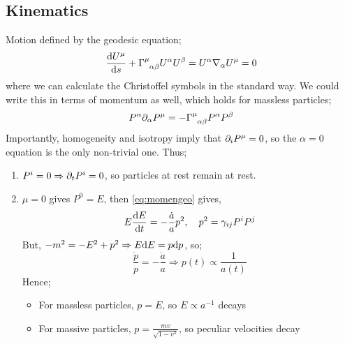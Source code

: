 \subsection{Kinematics}
Motion defined by the geodesic equation;
\begin{equation}
\frac{\ud U^\mu}{\ud s} + \Gamma\indices{^\mu_{\alpha \beta}}U^{\alpha}U^{\beta} = U^{\alpha} \nabla_{\alpha} U^{\mu} = 0
\end{equation}
where we can calculate the Christoffel symbols in the standard way. We could write this in terms of momentum as well, which holds for massless particles;
\begin{equation}
\label{eq:momengeo}
P^{\alpha} \del_\alpha P^\mu = -\Gamma\indices{^\mu_{\alpha \beta}}P^\alpha P^\beta
\end{equation}
Importantly, homogeneity and isotropy imply that $\partial_i P^\mu = 0$, so the $\alpha = 0$ equation is the only non-trivial one. Thus;
\begin{enumerate}
\item $P^i = 0 \Rightarrow \partial_t P^i = 0$, so particles at rest remain at rest.
\item $\mu = 0$ gives $P^0 = E$, then \eqref{eq:momengeo} gives,
\begin{equation}
E\frac{\text{d} E}{\text{d} t} = -\frac{\dot{a}}{a}p^2, \quad p^2 = \gamma_{ij} P^i P^j
\end{equation}
But, $-m^2 = -E^2 + p^2 \Rightarrow E\text{d} E = p \text{d} p$, so;
\begin{equation}
\frac{\dot{p}}{p} = - \frac{\dot{a}}{a} \Rightarrow p(t) \propto \frac{1}{a(t)}
\end{equation}
Hence;
\begin{itemize}
\item For massless particles, $p = E$, so $E \propto a^{-1}$ decays
\item For massive particles, $p = \tfrac{mv}{\sqrt{1- v^2}}$, so peculiar velocities decay
\end{itemize}
\end{enumerate}
